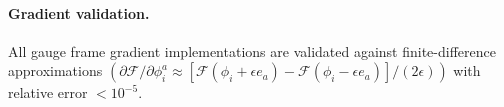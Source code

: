 \documentclass[twoside,11pt]{article}
\begin{document}
\paragraph{Gradient validation.} All gauge frame gradient implementations are validated against finite-difference approximations $(\partial \mathcal{F}/\partial \phi_i^a \approx [\mathcal{F}(\phi_i + \epsilon e_a) - \mathcal{F}(\phi_i - \epsilon e_a)]/(2\epsilon))$ with relative error $< 10^{-5}$.




\end{document}
